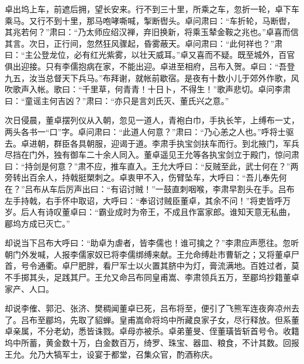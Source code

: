 卓出坞上车，前遮后拥，望长安来。行不到三十里，所乘之车，忽折一轮，卓下车乘马。又行不到十里，那马咆哮嘶喊，掣断辔头。卓问肃曰：“车折轮，马断辔，其兆若何？”肃曰：“乃太师应绍汉禅，弃旧换新，将乘玉辇金鞍之兆也。”卓喜而信其言。次日，正行间，忽然狂风骤起，昏雾蔽天。卓问肃曰：“此何祥也？”肃曰：“主公登龙位，必有红光紫雾，以壮天威耳。”卓又喜而不疑。既至城外，百官俱出迎接。只有李儒抱病在家，不能出迎。卓进至相府，吕布入贺。卓曰：“吾登九五，汝当总督天下兵马。”布拜谢，就帐前歇宿。是夜有十数小儿于郊外作歌，风吹歌声入帐。歌曰：“千里草，何青青！十日卜，不得生！”歌声悲切。卓问李肃曰：“童谣主何吉凶？”肃曰：“亦只是言刘氏灭、董氏兴之意。”

次日侵晨，董卓摆列仪从入朝，忽见一道人，青袍白巾，手执长竿，上缚布一丈，两头各书一“口”字。卓问肃曰：“此道人何意？”肃曰：“乃心恙之人也。”呼将士驱去。卓进朝，群臣各具朝服，迎谒于道。李肃手执宝剑扶车而行。到北掖门，军兵尽挡在门外，独有御车二十余人同入。董卓遥见王允等各执宝剑立于殿门，惊问肃曰：“持剑是何意？”肃不应，推车直入。王允大呼曰：“反贼至此，武士何在？”两旁转出百余人，持戟挺槊刺之。卓衷甲不入，伤臂坠车，大呼曰：“吾儿奉先何在？”吕布从车后厉声出曰：“有诏讨贼！”一鼓直刺咽喉，李肃早割头在手。吕布左手持戟，右手怀中取诏，大呼曰：“奉诏讨贼臣董卓，其余不问！”将吏皆呼万岁。后人有诗叹董卓曰：“霸业成时为帝王，不成且作富家郎。谁知天意无私曲，郿坞方成已灭亡。”

却说当下吕布大呼曰：“助卓为虐者，皆李儒也！谁可擒之？”李肃应声愿往。忽听朝门外发喊，人报李儒家奴已将李儒绑缚来献。王允命缚赴市曹斩之；又将董卓尸首，号令通衢。卓尸肥胖，看尸军士以火置其脐中为灯，膏流满地。百姓过者，莫不手掷其头，足践其尸。王允又命吕布同皇甫嵩、李肃领兵五万，至郿坞抄籍董卓家产、人口。

却说李傕、郭汜、张济、樊稠闻董卓已死，吕布将至，便引了飞熊军连夜奔凉州去了。吕布至郿坞，先取了貂蝉。皇甫嵩命将坞中所藏良家子女，尽行释放。但系董卓亲属，不分老幼，悉皆诛戮。卓母亦被杀。卓弟董旻、侄董璜皆斩首号令。收籍坞中所蓄，黄金数十万，白金数百万，绮罗、珠宝、器皿、粮食，不计其数。回报王允。允乃大犒军士，设宴于都堂，召集众官，酌酒称庆。

